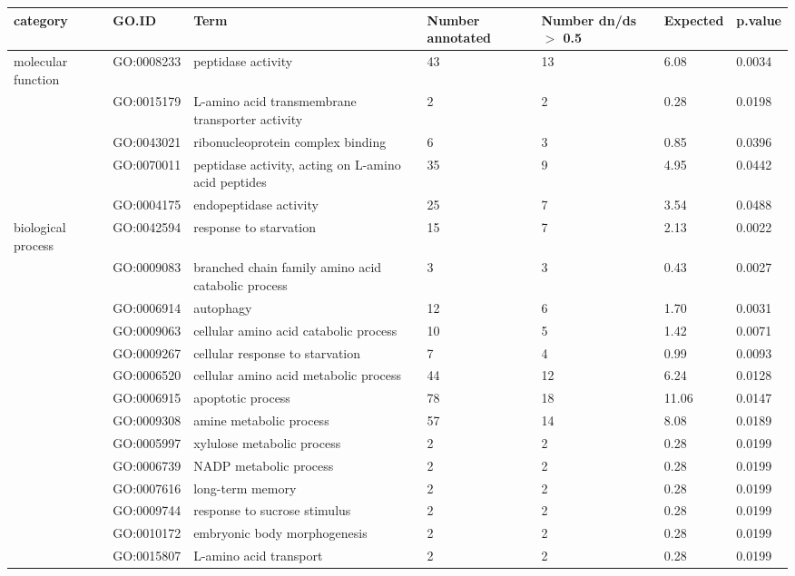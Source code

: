 \documentclass[10pt]{bmc_article}
\newenvironment{bmcformat}{\begin{raggedright}\baselineskip20pt\sloppy\setboolean{publ}{false}}{\end{raggedright}\baselineskip20pt\sloppy}
\begin{document}
\begin{bmcformat}
\begin{longtable}{p{1.7cm}lp{4.5cm}p{1cm}p{1cm}ll}
 category & GO.ID & Term & Number annotated & Number dn/ds $>$ 0.5 & Expected & p.value \\ 
  \hline
molecular function & GO:0008233 & peptidase activity &  43 &  13 & 6.08 & 0.0034 \\ 
   & GO:0015179 & L-amino acid transmembrane transporter activity &   2 &   2 & 0.28 & 0.0198 \\ 
   & GO:0043021 & ribonucleoprotein complex binding &   6 &   3 & 0.85 & 0.0396 \\ 
   & GO:0070011 & peptidase activity, acting on L-amino acid peptides &  35 &   9 & 4.95 & 0.0442 \\ 
   & GO:0004175 & endopeptidase activity &  25 &   7 & 3.54 & 0.0488 \\ 
   \hline
biological process & GO:0042594 & response to starvation &  15 &   7 & 2.13 & 0.0022 \\ 
   & GO:0009083 & branched chain family amino acid catabolic process &   3 &   3 & 0.43 & 0.0027 \\ 
   & GO:0006914 & autophagy &  12 &   6 & 1.70 & 0.0031 \\ 
   & GO:0009063 & cellular amino acid catabolic process &  10 &   5 & 1.42 & 0.0071 \\ 
   & GO:0009267 & cellular response to starvation &   7 &   4 & 0.99 & 0.0093 \\ 
   & GO:0006520 & cellular amino acid metabolic process &  44 &  12 & 6.24 & 0.0128 \\ 
   & GO:0006915 & apoptotic process &  78 &  18 & 11.06 & 0.0147 \\ 
   & GO:0009308 & amine metabolic process &  57 &  14 & 8.08 & 0.0189 \\ 
   & GO:0005997 & xylulose metabolic process &   2 &   2 & 0.28 & 0.0199 \\ 
   & GO:0006739 & NADP metabolic process &   2 &   2 & 0.28 & 0.0199 \\ 
   & GO:0007616 & long-term memory &   2 &   2 & 0.28 & 0.0199 \\ 
   & GO:0009744 & response to sucrose stimulus &   2 &   2 & 0.28 & 0.0199 \\ 
   & GO:0010172 & embryonic body morphogenesis &   2 &   2 & 0.28 & 0.0199 \\ 
   & GO:0015807 & L-amino acid transport &   2 &   2 & 0.28 & 0.0199 \\ 

\end{longtable}
\end{bmcformat}
\end{document}
